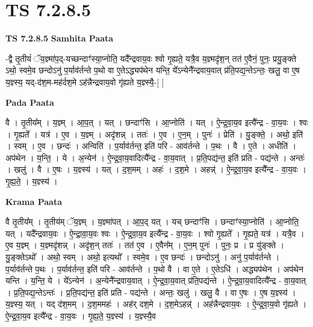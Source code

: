 \documentclass[17pt]{extarticle}
\begin{document}
\section{ TS 7.2.8.5 }

\textbf{TS 7.2.8.5 } \newline
\textbf{Samhita Paata} \newline

-द्वै तृ॒तीयं॑ ॅय॒ज्ञ्मा॑प॒द्-यच्छन्दाꣳ॑स्या॒प्नोति॒ यदै᳚न्द्रवाय॒वः श्वो गृ॒ह्यते॒ यत्रै॒व य॒ज्ञ्मदृ॑श॒न् तत॑ ए॒वैनं॒ पुनः॒ प्रयु॒ङ्क्ते ऽथो॒ स्वमे॒व छन्दोऽनु॑ प॒र्याव॑र्तन्ते प॒थो वा ए॒तेऽद्ध्यप॑थेन यन्ति॒ ये᳚ऽन्येनै᳚न्द्रवाय॒वात् प्र॑ति॒पद्य॒न्तेऽन्तः॒ खलु॒ वा ए॒ष य॒ज्ञ्स्य॒ यद्-द॑श॒म-मह॑र्दश॒मे ऽह॑न्नैन्द्रवाय॒वो गृ॑ह्यते य॒ज्ञ्स्यै॒-[  ] \newline

\textbf{Pada Paata} \newline

वै । तृ॒तीय᳚म् । य॒ज्ञ्म् । आ॒प॒त् । यत् । छन्दाꣳ॑सि । आ॒प्नोति॑ । यत् । ऐ॒न्द्र॒वा॒य॒व इत्यै᳚न्द्र - वा॒य॒वः । श्वः । गृ॒ह्यते᳚ । यत्र॑ । ए॒व । य॒ज्ञ्म् । अदृ॑शन्न् । ततः॑ । ए॒व । ए॒न॒म् । पुनः॑ । प्रेति॑ । यु॒ङ्क्ते॒ । अथो॒ इति॑ । स्वम् । ए॒व । छन्दः॑ । अन्विति॑ । प॒र्याव॑र्तन्त॒ इति॑ परि - आव॑र्तन्ते । प॒थः । वै । ए॒ते । अधीति॑ । अप॑थेन । य॒न्ति॒ । ये । अ॒न्येन॑ । ऐ॒न्द्र॒वा॒य॒वादित्यै᳚न्द्र - वा॒य॒वात् । प्र॒ति॒पद्य॑न्त॒ इति॑ प्रति - पद्य॑न्ते । अन्तः॑ । खलु॑ । वै । ए॒षः । य॒ज्ञ्स्य॑ । यत् । द॒श॒मम् । अहः॑ । द॒श॒मे । अहन्न्॑ । ऐ॒न्द्र॒वा॒य॒व इत्यै᳚न्द्र - वा॒य॒वः । गृ॒ह्य॒ते॒ । य॒ज्ञ्स्य॑ ।  \newline


\textbf{Krama Paata} \newline

वै तृ॒तीय᳚म् । तृ॒तीय॑म् ॅय॒ज्ञ्म् । य॒ज्ञ्मा॑पत् । आ॒प॒द् यत् । यच् छन्दाꣳ॑सि । छन्दाꣳ॑स्या॒प्नोति॑ । 
आ॒प्नोति॒ यत् । यदै᳚न्द्रवाय॒वः । ऐ॒न्द्रा॒वा॒य॒वः श्वः । ऐ॒न्द्र॒वा॒य॒व इत्यै᳚न्द्र - वा॒य॒वः । श्वो गृ॒ह्यते᳚ । गृ॒ह्यते॒ यत्र॑ । यत्रै॒व । ए॒व य॒ज्ञ्म् । य॒ज्ञ्मदृ॑शन्न् । अदृ॑श॒न् ततः॑ । तत॑ ए॒व । ए॒वैन᳚म् । ए॒न॒म् पुनः॑ । पुनः॒ प्र । प्र यु॑ङ्‍क्ते । यु॒ङ्‍क्तेऽथो᳚ । अथो॒ स्वम् । अथो॒ इत्यथो᳚ । स्वमे॒व । ए॒व छन्दः॑ । छन्दोऽनु॑ । अनु॑ प॒र्याव॑र्तन्ते । प॒र्याव॑र्तन्ते प॒थः । प॒र्याव॑र्तन्त॒ इति॑ परि - आव॑र्तन्ते । प॒थो वै । वा ए॒ते । ए॒तेऽधि॑ । अद्ध्यप॑थेन । अप॑थेन यन्ति । य॒न्ति॒ ये । ये᳚ऽन्येन॑ । अ॒न्येनै᳚न्द्रवाय॒वात् । ऐ॒न्द्र॒वा॒य॒वात् प्र॑ति॒पद्य॑न्ते । ऐ॒न्द्र॒वा॒य॒वादित्यै᳚न्द्र - वा॒य॒वात् । प्र॒ति॒पद्य॒न्तेऽन्तः॑ । प्र॒ति॒पद्य॑न्त॒ इति॑ प्रति - पद्य॑न्ते । अन्तः॒ खलु॑ । खलु॒ वै । वा ए॒षः । ए॒ष य॒ज्ञ्स्य॑ । य॒ज्ञ्स्य॒ यत् । यद् द॑श॒मम् । द॒श॒ममहः॑ । अह॑र् दश॒मे । द॒श॒मेऽहन्न्॑ । अह॑न्नैन्द्रवाय॒वः । ऐ॒न्द्र॒वा॒य॒वो गृ॑ह्यते । ऐ॒न्द्र॒वा॒य॒व इत्यै᳚न्द्र - वा॒य॒वः । गृ॒ह्य॒ते॒ य॒ज्ञ्स्य॑ । य॒ज्ञ्स्यै॒व \newline
\end{document}
